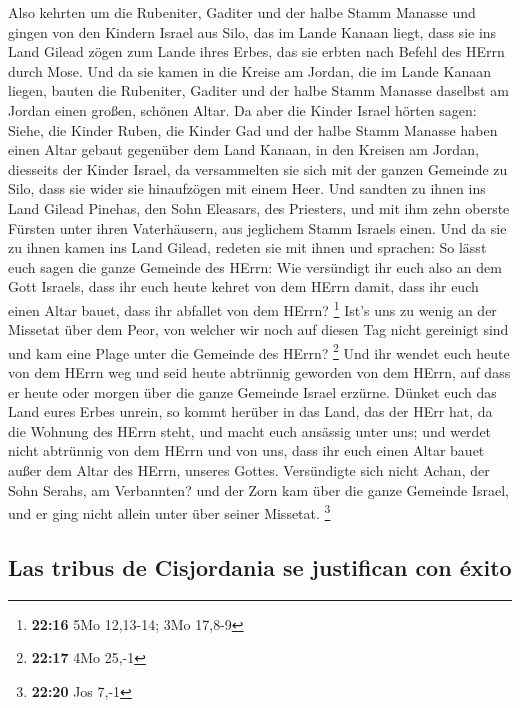  Also kehrten um die Rubeniter, Gaditer und der halbe
Stamm Manasse und gingen von den Kindern Israel aus Silo, das im Lande
Kanaan liegt, dass sie ins Land Gilead zögen zum Lande ihres Erbes, das
sie erbten nach Befehl des HErrn durch Mose.  Und da sie
kamen in die Kreise am Jordan, die im Lande Kanaan liegen, bauten die
Rubeniter, Gaditer und der halbe Stamm Manasse daselbst am Jordan einen
großen, schönen Altar.  Da aber die Kinder Israel hörten
sagen: Siehe, die Kinder Ruben, die Kinder Gad und der halbe Stamm
Manasse haben einen Altar gebaut gegenüber dem Land Kanaan, in den
Kreisen am Jordan, diesseits der Kinder Israel,  da
versammelten sie sich mit der ganzen Gemeinde zu Silo, dass sie wider
sie hinaufzögen mit einem Heer.  Und sandten zu ihnen ins
Land Gilead Pinehas, den Sohn Eleasars, des Priesters, 
und mit ihm zehn oberste Fürsten unter ihren Vaterhäusern, aus jeglichem
Stamm Israels einen.  Und da sie zu ihnen kamen ins Land
Gilead, redeten sie mit ihnen und sprachen:  So lässt
euch sagen die ganze Gemeinde des HErrn: Wie versündigt ihr euch also an
dem Gott Israels, dass ihr euch heute kehret von dem HErrn damit, dass
ihr euch einen Altar bauet, dass ihr abfallet von dem HErrn? \footnote{\textbf{22:16}
  5Mo 12,13-14; 3Mo 17,8-9}  Ist's uns zu wenig an der
Missetat über dem Peor, von welcher wir noch auf diesen Tag nicht
gereinigt sind und kam eine Plage unter die Gemeinde des HErrn?
\footnote{\textbf{22:17} 4Mo 25,-1}  Und ihr wendet euch
heute von dem HErrn weg und seid heute abtrünnig geworden von dem HErrn,
auf dass er heute oder morgen über die ganze Gemeinde Israel erzürne.
 Dünket euch das Land eures Erbes unrein, so kommt
herüber in das Land, das der HErr hat, da die Wohnung des HErrn steht,
und macht euch ansässig unter uns; und werdet nicht abtrünnig von dem
HErrn und von uns, dass ihr euch einen Altar bauet außer dem Altar des
HErrn, unseres Gottes.  Versündigte sich nicht Achan, der
Sohn Serahs, am Verbannten? und der Zorn kam über die ganze Gemeinde
Israel, und er ging nicht allein unter über seiner Missetat. \footnote{\textbf{22:20}
  Jos 7,-1}

\hypertarget{las-tribus-de-cisjordania-se-justifican-con-uxe9xito}{%
\subsection{Las tribus de Cisjordania se justifican con
éxito}\label{las-tribus-de-cisjordania-se-justifican-con-uxe9xito}}

